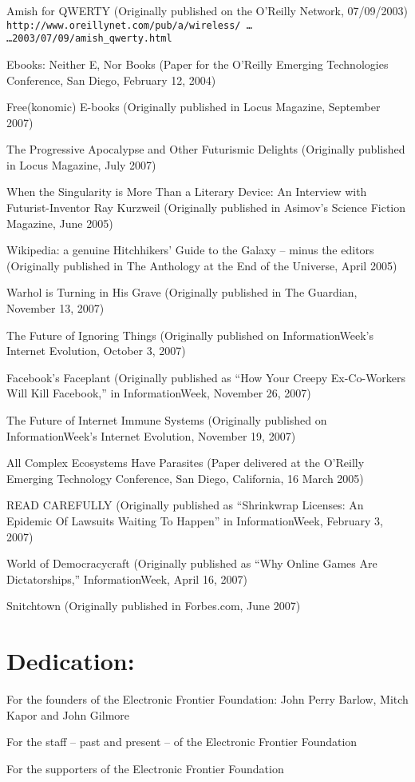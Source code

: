 \begin{parlist}
Amish for QWERTY (Originally published on the O'Reilly Network,
07/09/2003)\\
\texttt{http://www.oreillynet.com/pub/a/wireless/ \ldots \\
\vrule width 0pt \hfill \ldots 2003/07/09/amish\_qwerty.html}

Ebooks: Neither E, Nor Books (Paper for the O'Reilly Emerging
Technologies Conference, San Diego, February 12, 2004)

Free(konomic) E-books (Originally published in Locus Magazine,
September 2007)

The Progressive Apocalypse and Other Futurismic Delights
(Originally published in Locus Magazine, July 2007)

When the Singularity is More Than a Literary Device: An Interview
with Futurist-Inventor Ray Kurzweil (Originally published in
Asimov's Science Fiction Magazine, June 2005)

Wikipedia: a genuine Hitchhikers' Guide to the Galaxy -- minus the
editors (Originally published in The Anthology at the End of the
Universe, April 2005)

Warhol is Turning in His Grave (Originally published in The
Guardian, November 13, 2007)

The Future of Ignoring Things (Originally published on
InformationWeek's Internet Evolution, October 3, 2007)

Facebook's Faceplant (Originally published as ``How Your Creepy
Ex-Co-Workers Will Kill Facebook,'' in InformationWeek, November 26,
2007)

The Future of Internet Immune Systems (Originally published on
InformationWeek's Internet Evolution, November 19, 2007)

All Complex Ecosystems Have Parasites (Paper delivered at the
O'Reilly Emerging Technology Conference, San Diego, California, 16
March 2005)

READ CAREFULLY (Originally published as ``Shrinkwrap Licenses: An
Epidemic Of Lawsuits Waiting To Happen'' in InformationWeek,
February 3, 2007)

World of Democracycraft (Originally published as ``Why Online Games
Are Dictatorships,'' InformationWeek, April 16, 2007)

Snitchtown (Originally published in Forbes.com, June 2007)
\end{parlist}

\section{Dedication:}
\begin{parlist}
For the founders of the Electronic Frontier Foundation: John Perry
Barlow, Mitch Kapor and John Gilmore

For the staff -- past and present -- of the Electronic Frontier
Foundation

For the supporters of the Electronic Frontier Foundation
\end{parlist}

